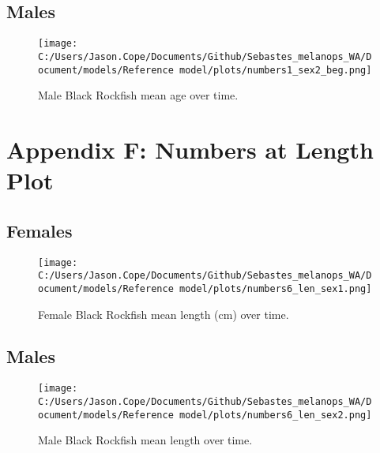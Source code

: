 \documentclass[11pt,
  letterpaper,
]{article}
\begin{document}
\hypertarget{males}{%
\subsection{Males}\label{males}}

\begin{figure}
{\centering
\texttt{[image: C:/Users/Jason.Cope/Documents/Github/Sebastes\_melanops\_WA/Document/models/Reference model/plots/numbers1\_sex2\_beg.png]}
}
\caption{Male Black Rockfish mean age over time.\label{fig:num_age_males}}
\end{figure}

\clearpage

\hypertarget{app-f}{%
\section{Appendix F: Numbers at Length Plot}\label{app-f}}

\hypertarget{females-1}{%
\subsection{Females}\label{females-1}}

\begin{figure}
{\centering
\texttt{[image: C:/Users/Jason.Cope/Documents/Github/Sebastes\_melanops\_WA/Document/models/Reference model/plots/numbers6\_len\_sex1.png]}
}
\caption{Female Black Rockfish mean length (cm) over time.\label{fig:num_lts_females}}
\end{figure}

\clearpage

\hypertarget{males-1}{%
\subsection{Males}\label{males-1}}

\begin{figure}
{\centering
\texttt{[image: C:/Users/Jason.Cope/Documents/Github/Sebastes\_melanops\_WA/Document/models/Reference model/plots/numbers6\_len\_sex2.png]}
}
\caption{Male Black Rockfish mean length over time.\label{fig:num_lts_males}}
\end{figure}

\clearpage
\end{document}
